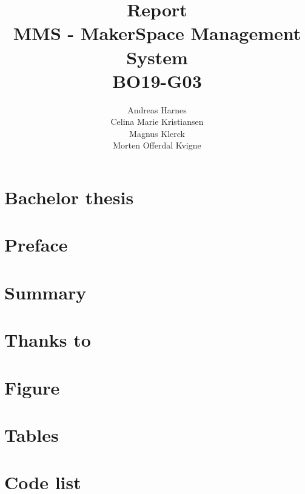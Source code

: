 \documentclass[12pt]{report}
\title {
    Report \\
    MMS - MakerSpace Management System \\
    BO19-G03
}
\author {
    Andreas Harnes \\
    Celina Marie Kristiansen \\
    Magnus Klerck \\
    Morten Offerdal Kvigne
}
\begin{document}
\maketitle

\section{Bachelor thesis}

\section{Preface}

\section{Summary}

\section{Thanks to}

\maketitle

\newpage

\tableofcontents

\newpage

\section{Figure}

\section{Tables}

\section{Code list}















\printbibliography
\end{document}
